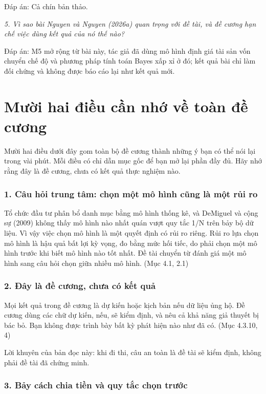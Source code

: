 Đáp án: Cả chín bản thảo.

{\itshape 5. Vì sao bài Nguyen và Nguyen (2026a) quan trọng với đề tài, và đề cương hạn chế việc dùng kết quả của nó thế nào?\par}

Đáp án: M5 mở rộng từ bài này, tác giả đã dùng mô hình định giá tài sản vốn chuyển chế độ và phương pháp tính toán Bayes xấp xỉ ở đó; kết quả bài chỉ làm đối chứng và không được báo cáo lại như kết quả mới.

\chapter{Mười hai điều cần nhớ về toàn đề cương}

Mười hai điều dưới đây gom toàn bộ đề cương thành những ý bạn có thể nói lại trong vài phút. Mỗi điều có chỉ dẫn mục gốc để bạn mở lại phần đầy đủ. Hãy nhớ rằng đây là đề cương, chưa có kết quả thực nghiệm nào.

\subsection{1. Câu hỏi trung tâm: chọn một mô hình cũng là một rủi ro}

Tổ chức đầu tư phân bổ danh mục bằng mô hình thống kê, và DeMiguel và cộng sự (2009) không thấy mô hình nào nhất quán vượt quy tắc 1/N trên bảy bộ dữ liệu. Vì vậy việc chọn mô hình là một quyết định có rủi ro riêng. Rủi ro lựa chọn mô hình là hậu quả bất lợi kỳ vọng, đo bằng mức hối tiếc, do phải chọn một mô hình trước khi biết mô hình nào tốt nhất. Đề tài chuyển từ đánh giá một mô hình sang câu hỏi chọn giữa nhiều mô hình. (Mục 4.1, 2.1)

\subsection{2. Đây là đề cương, chưa có kết quả}

Mọi kết quả trong đề cương là dự kiến hoặc kịch bản nếu dữ liệu ủng hộ. Đề cương dùng các chữ dự kiến, nếu, sẽ kiểm định, và nêu cả khả năng giả thuyết bị bác bỏ. Bạn không được trình bày bất kỳ phát hiện nào như đã có. (Mục 4.3.10, 4)

Lời khuyên của bản đọc này: khi đi thi, câu an toàn là đề tài sẽ kiểm định, không phải đề tài đã chứng minh.

\subsection{3. Bảy cách chia tiền và quy tắc chọn trước}

